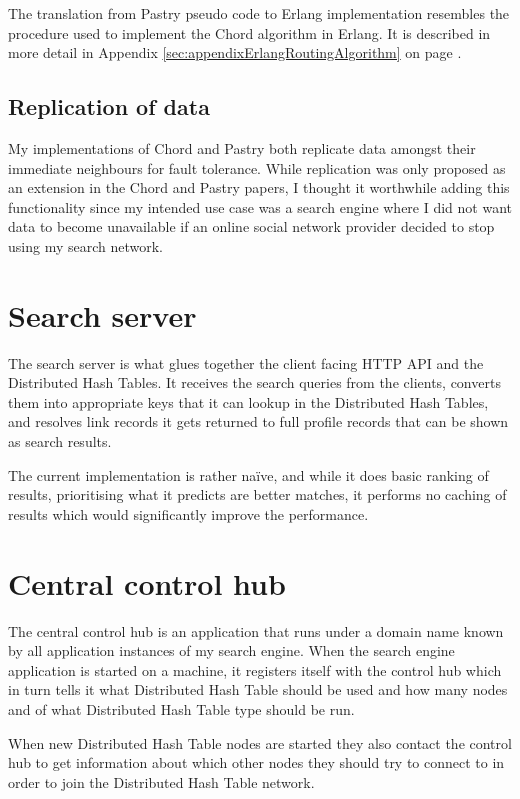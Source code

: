 The translation from Pastry pseudo code to Erlang implementation resembles the procedure used to implement the Chord algorithm in Erlang. It is described in more detail in Appendix \ref{sec:appendixErlangRoutingAlgorithm} on page \pageref{sec:appendixErlangRoutingAlgorithm}.

\subsection{Replication of data}
My implementations of Chord and Pastry both replicate data amongst their immediate neighbours for fault tolerance. While replication was only proposed as an extension in the Chord \cite{chord} and Pastry \cite{pastry} papers, I thought it worthwhile adding this functionality since my intended use case was a search engine where I did not want data to become unavailable if an online social network provider decided to stop using my search network.

\section{Search server}
The search server is what glues together the client facing HTTP API and the Distributed Hash Tables. It receives the search queries from the clients, converts them into appropriate keys that it can lookup in the Distributed Hash Tables, and resolves link records it gets returned to full profile records that can be shown as search results.

The current implementation is rather na\"ive, and while it does basic ranking of results, prioritising what it predicts are better matches, it performs no caching of results which would significantly improve the performance.

\section{Central control hub}
The central control hub is an application that runs under a domain name known by all application instances of my search engine.
When the search engine application is started on a machine, it registers itself with the control hub which in turn tells it what Distributed Hash Table should be used and how many nodes and of what Distributed Hash Table type should be run.

When new Distributed Hash Table nodes are started they also contact the control hub to get information about which other nodes they should try to connect to in order to join the Distributed Hash Table network.

